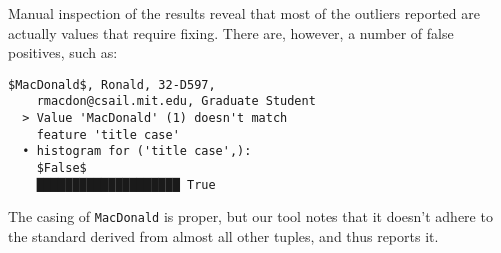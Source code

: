 Manual inspection of the results reveal that most of the outliers reported are actually values that require fixing. There are, however, a number of false positives, such as:

\begin{lstlisting}[gobble=2]
  $MacDonald$, Ronald, 32-D597, 
    rmacdon@csail.mit.edu, Graduate Student    
  > Value 'MacDonald' (1) doesn't match 
    feature 'title case'  
  • histogram for ('title case',):
    $False$
    ████████████████████ True
\end{lstlisting}

The casing of \lstinline{MacDonald} is proper, but our tool notes that it doesn't adhere to the standard derived from almost all other tuples, and thus reports it. 
